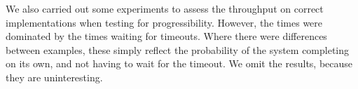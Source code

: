 

We also carried out some experiments to assess the throughput on correct
implementations when testing for progressibility.  However, the times were
dominated by the times waiting for timeouts.  Where there were differences
between examples, these simply reflect the probability of the system
completing on its own, and not having to wait for the timeout.  We omit the
results, because they are uninteresting.
